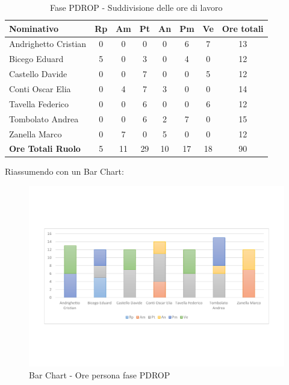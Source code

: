 \documentclass[../PianoProgetto.tex]{subfiles}
\begin{document}
	\begin{table}[h]
		\begin{tabularx}{\textwidth}{l  * {6}{C}  c}
			\toprule
			\textbf{Nominativo} & \textbf{Rp} & \textbf{Am} & \textbf{Pt} 
						& \textbf{An} & \textbf{Pm} & \textbf{Ve} & \textbf{Ore totali} \\
			\midrule
			Andrighetto Cristian & 0 & 0 & 0 & 0 & 6 & 7 & 13 \\
			Bicego Eduard & 5 & 0 &	3 &	0 &	4 &	0 &	12 \\
			Castello Davide & 0 & 0 & 7 & 0 & 0 & 5 & 12 \\
			Conti Oscar Elia &0 & 4 & 7 & 3 & 0 & 0 & 14 \\
			Tavella Federico &	0 & 0 & 6 & 0 & 0 & 6 & 12 \\
			Tombolato Andrea & 0 & 0 & 6 & 2 & 7 & 0 & 15 \\
			Zanella Marco & 0 & 7 & 0 & 5 & 0 & 0 & 12 \\
			\midrule			
			\textbf{Ore Totali Ruolo} & 5 & 11 & 29 & 10 & 17 & 18 & 90 \\
			\bottomrule
		\end{tabularx}
		\caption{Fase PDROP - Suddivisione delle ore di lavoro}
		\label{tab:fasePDROP_ore}
	\end{table}
	
\newpage
\vfill	
	Riassumendo con un Bar Chart:
	
	\begin{figure}[!h]
		\centering
		\includegraphics[width=\textwidth , trim=2cm 5cm 2cm 5cm]{grafici/PDROP/PDROP-ore-persona}
			\caption{Bar Chart - Ore persona fase PDROP}
		\label{fig:BarChart-fasePDROP_ore}
	\end{figure}
\vfill	
	
\end{document}
